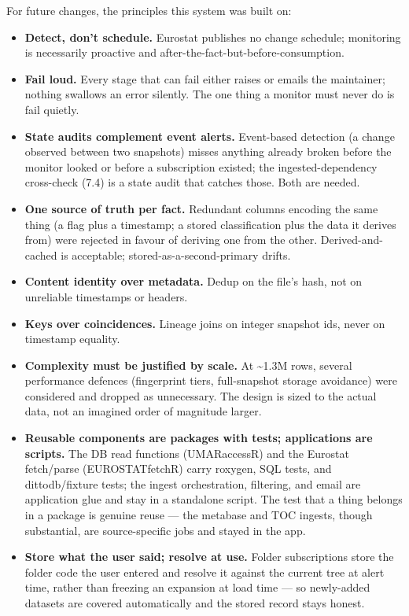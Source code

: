\documentclass[
]{article}
\providecommand{\tightlist}{%
  \setlength{\itemsep}{0pt}\setlength{\parskip}{0pt}}
\begin{document}
For future changes, the principles this system was built on:

\begin{itemize}
\tightlist
\item
  \textbf{Detect, don't schedule.} Eurostat publishes no change
  schedule; monitoring is necessarily proactive and
  after-the-fact-but-before-consumption.
\item
  \textbf{Fail loud.} Every stage that can fail either raises or emails
  the maintainer; nothing swallows an error silently. The one thing a
  monitor must never do is fail quietly.
\item
  \textbf{State audits complement event alerts.} Event-based detection
  (a change observed between two snapshots) misses anything already
  broken before the monitor looked or before a subscription existed; the
  ingested-dependency cross-check (7.4) is a state audit that catches
  those. Both are needed.
\item
  \textbf{One source of truth per fact.} Redundant columns encoding the
  same thing (a flag plus a timestamp; a stored classification plus the
  data it derives from) were rejected in favour of deriving one from the
  other. Derived-and-cached is acceptable; stored-as-a-second-primary
  drifts.
\item
  \textbf{Content identity over metadata.} Dedup on the file's hash, not
  on unreliable timestamps or headers.
\item
  \textbf{Keys over coincidences.} Lineage joins on integer snapshot
  ids, never on timestamp equality.
\item
  \textbf{Complexity must be justified by scale.} At \textasciitilde1.3M
  rows, several performance defences (fingerprint tiers, full-snapshot
  storage avoidance) were considered and dropped as unnecessary. The
  design is sized to the actual data, not an imagined order of magnitude
  larger.
\item
  \textbf{Reusable components are packages with tests; applications are
  scripts.} The DB read functions (UMARaccessR) and the Eurostat
  fetch/parse (EUROSTATfetchR) carry roxygen, SQL tests, and
  dittodb/fixture tests; the ingest orchestration, filtering, and email
  are application glue and stay in a standalone script. The test that a
  thing belongs in a package is genuine reuse --- the metabase and TOC
  ingests, though substantial, are source-specific jobs and stayed in
  the app.
\item
  \textbf{Store what the user said; resolve at use.} Folder
  subscriptions store the folder code the user entered and resolve it
  against the current tree at alert time, rather than freezing an
  expansion at load time --- so newly-added datasets are covered
  automatically and the stored record stays honest.
\end{itemize}
\end{document}
